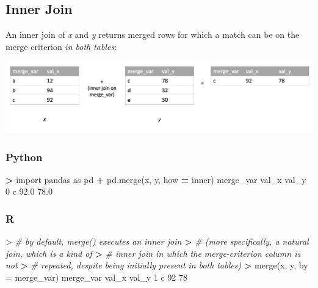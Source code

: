 \documentclass[
]{book}
\newenvironment{Shaded}{\begin{snugshade}}{\end{snugshade}}
\newcommand{\AttributeTok}[1]{\textcolor[rgb]{0.77,0.63,0.00}{#1}}
\newcommand{\CommentTok}[1]{\textcolor[rgb]{0.56,0.35,0.01}{\textit{#1}}}
\newcommand{\DecValTok}[1]{\textcolor[rgb]{0.00,0.00,0.81}{#1}}
\newcommand{\ErrorTok}[1]{\textcolor[rgb]{0.64,0.00,0.00}{\textbf{#1}}}
\newcommand{\FloatTok}[1]{\textcolor[rgb]{0.00,0.00,0.81}{#1}}
\newcommand{\FunctionTok}[1]{\textcolor[rgb]{0.00,0.00,0.00}{#1}}
\newcommand{\ImportTok}[1]{#1}
\newcommand{\NormalTok}[1]{#1}
\newcommand{\OperatorTok}[1]{\textcolor[rgb]{0.81,0.36,0.00}{\textbf{#1}}}
\newcommand{\SpecialCharTok}[1]{\textcolor[rgb]{0.00,0.00,0.00}{#1}}
\newcommand{\StringTok}[1]{\textcolor[rgb]{0.31,0.60,0.02}{#1}}
\begin{document}
\hypertarget{inner-join}{%
\subsection{Inner Join}\label{inner-join}}

An inner join of \emph{x} and \emph{y} returns merged rows for which a match can be on the merge criterion \emph{in both tables}:

\includegraphics[width=17.25in]{images/inner_join}

\hypertarget{python-29}{%
\subsubsection*{Python}\label{python-29}}

\begin{Shaded}
\begin{Highlighting}[]
\OperatorTok{\textgreater{}} \ImportTok{import}\NormalTok{ pandas }\ImportTok{as}\NormalTok{ pd}
\OperatorTok{+}\NormalTok{ pd.merge(x, y, how }\OperatorTok{=} \StringTok{\textquotesingle{}inner\textquotesingle{}}\NormalTok{)}
\NormalTok{  merge\_var  val\_x  val\_y}
\DecValTok{0}\NormalTok{         c   }\FloatTok{92.0}   \FloatTok{78.0}
\end{Highlighting}
\end{Shaded}

\hypertarget{r-29}{%
\subsubsection*{R}\label{r-29}}

\begin{Shaded}
\begin{Highlighting}[]
\SpecialCharTok{\textgreater{}} \CommentTok{\# by default, merge() executes an inner join}
\ErrorTok{\textgreater{}} \CommentTok{\# (more specifically, a natural join, which is a kind of}
\ErrorTok{\textgreater{}} \CommentTok{\# inner join in which the merge{-}criterion column is not}
\ErrorTok{\textgreater{}} \CommentTok{\# repeated, despite being initially present in both tables)}
\ErrorTok{\textgreater{}} \FunctionTok{merge}\NormalTok{(x, y, }\AttributeTok{by =} \StringTok{\textquotesingle{}merge\_var\textquotesingle{}}\NormalTok{)}
\NormalTok{  merge\_var val\_x val\_y}
\DecValTok{1}\NormalTok{         c    }\DecValTok{92}    \DecValTok{78}
\end{Highlighting}
\end{Shaded}
\end{document}
